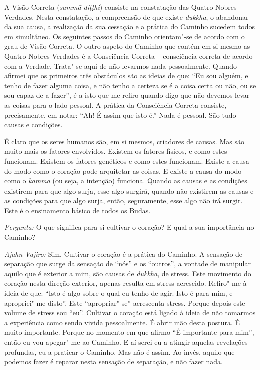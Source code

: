 A Visão Correta (\emph{sammā-diṭṭhi}) consiste na constatação das Quatro Nobres
Verdades. Nesta constatação, a compreensão de que existe \emph{dukkha}, o
abandonar da sua causa, a realização da sua cessação e a prática do Caminho
sucedem todos em simultâneo. Os seguintes passos do Caminho orientam"-se de
acordo com o grau de Visão Correta. O outro aspeto do Caminho que contém em si
mesmo as Quatro Nobres Verdades é a Consciência Correta -- consciência correta
de acordo com a Verdade. Trata"-se aqui de não levarmos nada pessoalmente. Quando
afirmei que os primeiros três obstáculos são as ideias de que: ``Eu sou alguém, e
tenho de fazer alguma coisa, e não tenho a certeza se é a coisa certa ou não, ou
se sou capaz de a fazer'', é a isto que me refiro quando digo que não devemos
levar as coisas para o lado pessoal. A prática da Consciência Correta consiste,
precisamente, em notar: ``Ah! É assim que isto é.'' Nada é pessoal. São tudo
causas e condições.

É claro que os seres humanos são, em si mesmos, criadores de causas. Mas são
muito mais os fatores envolvidos. Existem os fatores físicos, e como estes
funcionam. Existem os fatores genéticos e como estes funcionam. Existe a causa
do modo como o coração pode arquitetar as coisas. E existe a causa do modo como
o \emph{kamma} (ou seja, a intenção) funciona. Quando as causas e as condições
existirem para que algo surja, esse algo surgirá, quando não existirem as causas
e as condições para que algo surja, então, seguramente, esse algo não irá surgir.
Este é o ensinamento básico de todos os Budas.

\bigskip

\emph{Pergunta:} O que significa para si cultivar o coração? E qual a sua
importância no Caminho?

\emph{Ajahn Vajiro:} Sim. Cultivar o coração é a prática do Caminho. A sensação
de separação que surge da sensação de ``nós'' e os ``outros'', a vontade de manipular
 aquilo que é exterior a mim,
são causas de \emph{dukkha}, de stress. Este movimento do coração nesta direção
exterior, apenas resulta em stress acrescido. Refiro"-me à ideia de que: ``Isto é
algo sobre o qual eu tenho de agir. Isto é para mim, e apropriei"-me disto''.
Este ``apropriar"-se'' acrescenta stress. Porque depois este volume de stress sou
``eu''. Cultivar o coração está ligado à ideia de não tomarmos a experiência
como sendo vivida pessoalmente. É abrir mão desta postura. É muito importante.
Porque no momento em que afirmo ``É importante para mim'', então eu vou
apegar"-me ao Caminho. E aí serei eu a atingir aquelas revelações profundas, eu a
praticar o Caminho. Mas não é assim. Ao invés, aquilo que podemos fazer é
reparar nesta sensação de separação, e não fazer nada.

